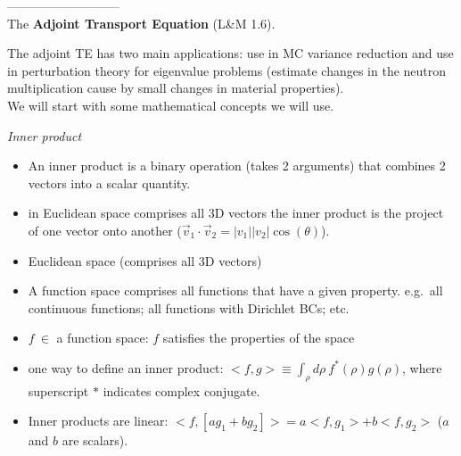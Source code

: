 \documentclass[12pt]{article}
\begin{document}
---------------------------\\
The \textbf{Adjoint Transport Equation} (L\&M 1.6).

The adjoint TE has two main applications: use in MC variance reduction and use in perturbation theory for eigenvalue problems (estimate changes in the neutron multiplication cause by small changes in material properties). \\
We will start with some mathematical concepts we will use.

\textit{Inner product}
\begin{itemize}
\item An inner product is a binary operation (takes 2 arguments) that combines 2 vectors into a scalar quantity.
\item in Euclidean space comprises all 3D vectors the inner product is the project of one vector onto another ($\vec{v}_1 \cdot \vec{v}_2 = |v_1||v_2|\cos(\theta)$).
\item Euclidean space (comprises all 3D vectors)
\item A function space comprises all functions that have a given property. e.g.\ all continuous functions; all functions with Dirichlet BCs; etc.
\item $f \: \in$ a function space: $f$ satisfies the properties of the space
\item one way to define an inner product: $<f,g> \equiv \int_{\rho} d\rho \: f^{*}(\rho) g(\rho)$, where superscript $*$ indicates complex conjugate.
\item Inner products are linear: $<f, [ag_1 + bg_2]> = a<f, g_1> + b<f, g_2>$ ($a$ and $b$ are scalars).
\end{itemize}
\end{document}
